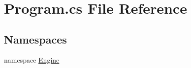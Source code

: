 \hypertarget{a00011}{}\section{Program.\+cs File Reference}
\label{a00011}
\subsection*{Namespaces}
\begin{DoxyCompactItemize}
\item 
namespace \hyperlink{a00240}{Engine}
\end{DoxyCompactItemize}
